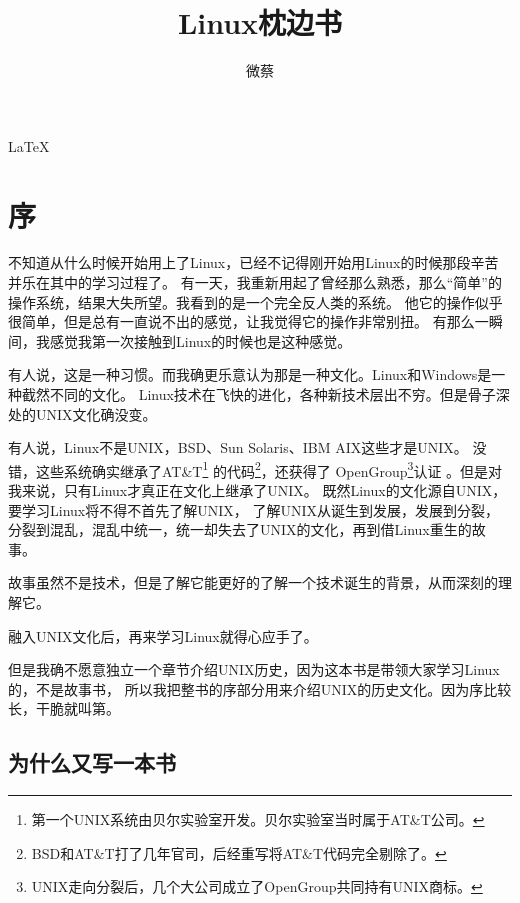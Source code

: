 \documentclass[amstex]{ctexbook}
\title{Linux枕边书}
\author{微蔡}
\begin{document}
\thispagestyle{empty}

\makeatletter

\begin{center}

\begin{Huge}


\LaTeX

\@title


\end{Huge}

\end{center}

\makeatother 
\setcounter{page}{0}

 
\tableofcontents

\chapter{序}
不知道从什么时候开始用上了Linux，已经不记得刚开始用Linux的时候那段辛苦并乐在其中的学习过程了。
有一天，我重新用起了曾经那么熟悉，那么“简单”的操作系统，结果大失所望。我看到的是一个完全反人类的系统。
他它的操作似乎很简单，但是总有一直说不出的感觉，让我觉得它的操作非常别扭。
有那么一瞬间，我感觉我第一次接触到Linux的时候也是这种感觉。

有人说，这是一种习惯。而我确更乐意认为那是一种文化。Linux和Windows是一种截然不同的文化。
Linux技术在飞快的进化，各种新技术层出不穷。但是骨子深处的UNIX文化确没变。

有人说，Linux不是UNIX，BSD、Sun Solaris、IBM AIX这些才是UNIX。
没错，这些系统确实继承了AT\&T\footnote{第一个UNIX系统由贝尔实验室开发。贝尔实验室当时属于AT\&T公司。}
的代码\footnote{BSD和AT\&T打了几年官司，后经重写将AT\&T代码完全剔除了。}，还获得了
OpenGroup\footnote{UNIX走向分裂后，几个大公司成立了OpenGroup共同持有UNIX商标。}认证
。但是对我来说，只有Linux才真正在文化上继承了UNIX。
既然Linux的文化源自UNIX，要学习Linux将不得不首先了解UNIX，
了解UNIX从诞生到发展，发展到分裂，分裂到混乱，混乱中统一，统一却失去了UNIX的文化，再到借Linux重生的故事。

故事虽然不是技术，但是了解它能更好的了解一个技术诞生的背景，从而深刻的理解它。

融入UNIX文化后，再来学习Linux就得心应手了。

但是我确不愿意独立一个章节介绍UNIX历史，因为这本书是带领大家学习Linux的，不是故事书，
所以我把整书的序部分用来介绍UNIX的历史文化。因为序比较长，干脆就叫第。

\section{为什么又写一本书}
\end{document}

